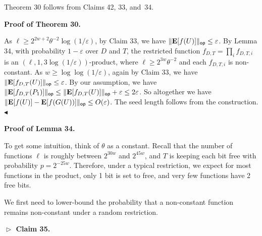 \documentclass[10pt,a4paper]{article}
\begin{document}



Theorem 30 follows from Claims 42, 33, and 34.\par




\par\medskip\noindent\textbf{Proof of Theorem 30.}\par




As $\ell\geq 2^{2w+2}\theta^{-2}\log(1/\varepsilon)$, by Claim 33, we have $\lVert\mathop{\bf E\/}[f(U)]\rVert_{\mathsf{op}}\leq\varepsilon$.
By Lemma 34, with probability $1-\varepsilon$ over $D$ and $T$, the restricted function $f_{D,T}=\prod_{i}f_{D,T,i}$ is an $(\ell,1,3\log(1/\varepsilon))$-product, where $\ell\geq 2^{3w}\theta^{-2}$ and each $f_{D,T,i}$ is non-constant.
As $w\geq\log\log(1/\varepsilon)$, again by Claim 33, we have $\lVert\mathop{\bf E\/}[f_{D,T}(U)]\rVert_{\mathsf{op}}\leq\varepsilon$.
By our assumption, we have $\lVert\mathop{\bf E\/}[f_{D,T}(P_{1})]\rVert_{\mathsf{op}}\leq\lVert\mathop{\bf E\/}[f_{D,T}(U)]\rVert_{\mathsf{op}}+\varepsilon\leq 2\varepsilon$.
So altogether we have $\lVert\mathop{\bf E\/}[f(U)]-\mathop{\bf E\/}[f(G(U))]\rVert_{\mathsf{op}}\leq
O(\varepsilon)$.
The seed length follows from the construction.
$\blacktriangleleft$\par





\par\medskip\noindent\textbf{Proof of Lemma 34.}\par




To get some intuition, think of $\theta$ as a constant.
Recall that the number of functions $\ell$ is roughly between $2^{30w}$ and $2^{45w}$, and $T$ is keeping each bit free with probability $p=2^{-25w}$.
Therefore, under a typical restriction, we expect for most functions in the product, only 1 bit is set to free, and very few functions have 2 free bits.\par




We first need to lower-bound the probability that a non-constant function remains non-constant under a random restriction.\par





\par\medskip\noindent\textbf{
$\vartriangleright$ Claim 35. }\par
\end{document}
